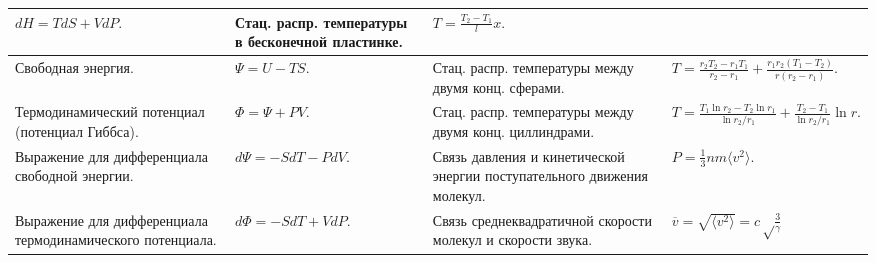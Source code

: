 \documentclass{article}
\begin{document}
\begin{tabular}{ |p{4.5cm}|p{5cm}|p{4.5cm}|p{5cm}|  }
$dH = TdS + VdP.$                                                            &  %
Стац. распр. температуры в бесконечной пластинке.                            &  %
$T = \frac{T_2 - T_1}{l}x.$                                                  \\ %
\hline
Свободная энергия.                                                           &  %
$\Psi = U - TS.$                                                             &  %
Стац. распр. температуры между двумя конц. сферами.                          &  %
$T = \frac{r_2T_2 - r_1T_1}{r_2-r_1} + \frac{r_1r_2(T_1 - T_2)}{r(r_2-r_1)}.$\\ %
\hline
Термодинамический потенциал (потенциал Гиббса).                              &  %
$\Phi = \Psi + PV.$                                                          &  %
Стац. распр. температуры между двумя конц. циллиндрами.                      &  %
$T = 
\frac{T_1 \ln r_2 - T_2 \ln r_1}{\ln r_2/r_1} + 
\frac{T_2 - T_1}{\ln r_2/r_1} \ln r.$                                        \\ %
\hline
Выражение для дифференциала свободной энергии.                               &  %
$d\Psi = -SdT - PdV.$                                                        &  %
Связь давления и кинетической энергии поступательного движения молекул.      &  %
$P = \frac{1}{3} nm \langle v^2 \rangle.$                                    \\ %
\hline
Выражение для дифференциала термодинамического потенциала.                   &  %
$d\Phi = -SdT + VdP.$                                                        &  %
Связь среднеквадратичной скорости молекул и скорости звука.                  &  %
$\overline{v} = \sqrt{\langle v^2 \rangle} = c \sqrt\frac{3}{\gamma}$        \\ %
\hline
\end{tabular}

\newpage
\end{document}
